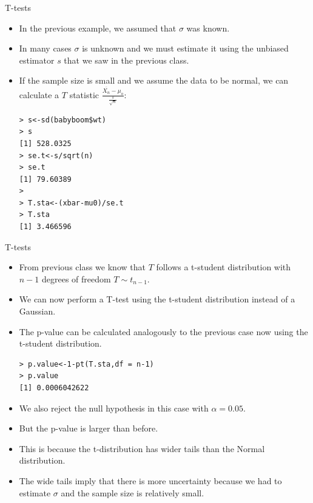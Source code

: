 \documentclass[handout]{beamer}
\begin{document}
\begin{frame}[fragile]{T-tests}
\scriptsize{

 \begin{itemize}
 \item In the previous example, we assumed that $\sigma$ was known.
 \item In many cases  $\sigma$ is unknown and we must estimate it using the unbiased estimator $s$ that we saw in the previous class.
 \item If the sample size is small and we assume the data to be normal, we can calculate a $T$ statistic $\frac{\overline{X_{n}}-\mu_{o}}{\frac{s}{\sqrt{n}}}$:
 \begin{verbatim}
> s<-sd(babyboom$wt)
> s
[1] 528.0325
> se.t<-s/sqrt(n)
> se.t
[1] 79.60389
> 
> T.sta<-(xbar-mu0)/se.t
> T.sta
[1] 3.466596
 \end{verbatim}

 
\end{itemize}


} 
\end{frame}


\begin{frame}[fragile]{T-tests}
\scriptsize{

 \begin{itemize}
 \item From previous class we know that $T$ follows a t-student distribution with $n-1$ degrees of freedom  $T \sim t_{n-1}$.
 \item We can now  perform a T-test using the t-student distribution instead of a Gaussian.
 
 \item The p-value can be calculated analogously to the previous case now using the t-student distribution.
 
  
 \begin{verbatim}
> p.value<-1-pt(T.sta,df = n-1)
> p.value
[1] 0.0006042622
 \end{verbatim}

 \item We also reject the null hypothesis in this case with $\alpha=0.05$.
 \item But the p-value is larger than before.
 \item This is because the t-distribution has wider tails than the Normal distribution.
 \item The wide tails imply that there is more uncertainty because we had to estimate $\sigma$ and the sample size is relatively small.
\end{itemize}


} 
\end{frame}
\end{document}
